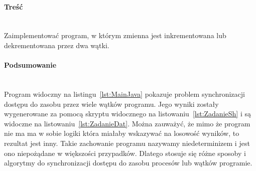\paragraph{Treść}~\\
Zaimplementować program, w którym zmienna jest inkrementowana lub dekrementowana przez dwa wątki.







\paragraph{Podsumowanie}~\\
Program widoczny na listingu~\ref{lst:MainJava} pokazuje problem synchronizacji dostępu do zasobu przez wiele wątków programu.
Jego wyniki zostały wygenerowane za pomocą skryptu widocznego na listowaniu~\ref{lst:ZadanieSh} i są widoczne na listowaniu~\ref{lst:ZadanieDat}.
Można zauważyć, że mimo że program nie ma ma w sobie logiki która miałaby wskazywać na losowość wyników, to rezultat jest inny.
Takie zachowanie programu nazywamy niedeterminizem i jest ono niepożądane w większości przypadków.
Dlatego stosuje się różne sposoby i algorytmy do synchronizacji dostępu do zasobu procesów lub wątków programie.
